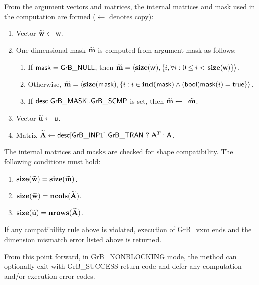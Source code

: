 From the argument vectors and matrices, the internal matrices and mask used in 
the computation are formed ($\leftarrow$ denotes copy):
\begin{enumerate}
	\item Vector ${\bf \widetilde{w}} \leftarrow {\sf w}$.

	\item One-dimensional mask ${\bf \widetilde{m}}$ is computed from 
    argument {\sf mask} as follows:
	\begin{enumerate}
		\item	If ${\sf mask} = {\sf GrB\_NULL}$, then ${\bf \widetilde{m}} = 
        \langle \bold{size}({\sf w}), \{i, \forall i : 0 \leq i < 
        \bold{size}({\sf w}) \} \rangle$.

		\item	Otherwise, ${\bf \widetilde{m}} = 
        \langle \bold{size}({\sf mask}), \{i :  i \in \bold{ind}({\sf mask}) \wedge
        ({\sf bool}){\sf mask}(i) = {\sf true} \} \rangle$.

		\item	If ${\sf desc[GrB\_MASK].GrB\_SCMP}$ is set, then 
        ${\bf \widetilde{m}} \leftarrow \neg {\bf \widetilde{m}}$.
	\end{enumerate}

	\item Vector ${\bf \widetilde{u}} \leftarrow {\sf u}$.

	\item Matrix ${\bf \widetilde{A}} \leftarrow {\sf desc[GrB\_INP1].GrB\_TRAN} \ ? \ {\sf A}^T : {\sf A}$.
\end{enumerate}

The internal matrices and masks are checked for shape compatibility. The following 
conditions must hold:
\begin{enumerate}
	\item $\bold{size}({\bf \widetilde{w}}) = \bold{size}({\bf \widetilde{m}})$.

	\item $\bold{size}({\bf \widetilde{w}}) = \bold{ncols}({\bf \widetilde{A}})$.

	\item $\bold{size}({\bf \widetilde{u}}) = \bold{nrows}({\bf \widetilde{A}})$.
\end{enumerate}
If any compatibility rule above is violated, execution of {\sf GrB\_vxm} ends and 
the dimension mismatch error listed above is returned.

From this point forward, in {\sf GrB\_NONBLOCKING} mode, the method can 
optionally exit with {\sf GrB\_SUCCESS} return code and defer any computation 
and/or execution error codes.

